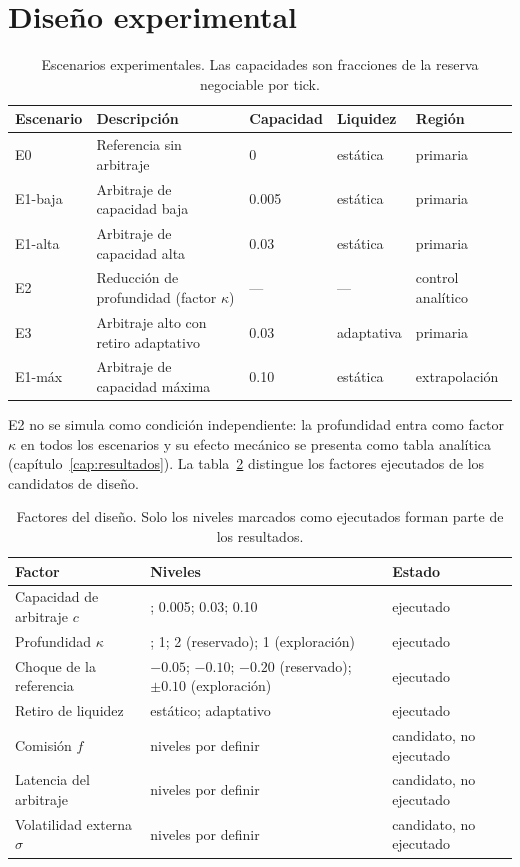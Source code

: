 \section{Diseño experimental}

\begin{table}[htbp]
\centering
\caption{Escenarios experimentales. Las capacidades son fracciones de la reserva negociable por tick.}
\label{tab:escenarios}
\small
\begin{tabularx}{\textwidth}{@{}l >{\raggedright\arraybackslash}X l l l@{}}
\toprule
Escenario & Descripción & Capacidad & Liquidez & Región \\
\midrule
E0 & Referencia sin arbitraje & 0 & estática & primaria \\
E1-baja & Arbitraje de capacidad baja & 0.005 & estática & primaria \\
E1-alta & Arbitraje de capacidad alta & 0.03 & estática & primaria \\
E2 & Reducción de profundidad (factor $\kappa$) & --- & --- & control analítico \\
E3 & Arbitraje alto con retiro adaptativo & 0.03 & adaptativa & primaria \\
E1-máx & Arbitraje de capacidad máxima & 0.10 & estática & extrapolación \\
\bottomrule
\end{tabularx}
\end{table}

E2 no se simula como condición independiente: la profundidad entra como factor $\kappa$ en todos los escenarios y su efecto mecánico se presenta como tabla analítica (capítulo~\ref{cap:resultados}). La tabla~\ref{tab:factores} distingue los factores ejecutados de los candidatos de diseño.

\begin{table}[htbp]
\centering
\caption{Factores del diseño. Solo los niveles marcados como ejecutados forman parte de los resultados.}
\label{tab:factores}
\scriptsize
\setlength{\tabcolsep}{3pt}
\renewcommand{\arraystretch}{0.9}
\begin{tabularx}{\textwidth}{@{}>{\raggedright\arraybackslash}p{} >{\raggedright\arraybackslash}X >{\raggedright\arraybackslash}p{}@{}}
\toprule
Factor & Niveles & Estado \\
\midrule
Capacidad de arbitraje $c$ & 0; 0.005; 0.03; 0.10 & ejecutado \\
Profundidad $\kappa$ & 0.5; 1; 2 (reservado); 1 (exploración) & ejecutado \\
Choque de la referencia & $-0.05$; $-0.10$; $-0.20$ (reservado); $\pm0.10$ (exploración) & ejecutado \\
Retiro de liquidez & estático; adaptativo & ejecutado \\
Comisión $f$ & niveles por definir & candidato, no ejecutado \\
Latencia del arbitraje & niveles por definir & candidato, no ejecutado \\
Volatilidad externa $\sigma$ & niveles por definir & candidato, no ejecutado \\
\bottomrule
\end{tabularx}
\end{table}

